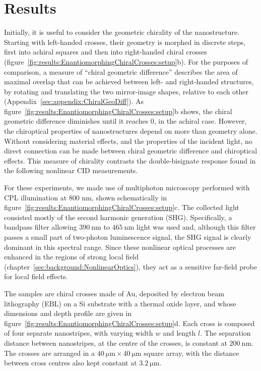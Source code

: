\section{Results}\label{sec:results:EnantiomorphingChiralCrosses:results}

Initially, it is useful to consider the geometric chirality of the nanostructure. Starting with left-handed crosses, their geometry is morphed in discrete steps, first into achiral squares and then into right-handed chiral crosses (figure~\ref{fig:results:EnantiomorphingChiralCrosses:setup}b). 
For the purposes of comparison, a measure of ``chiral geometric difference'' describes the area of maximal overlap that can be achieved between left- and right-handed structures, by rotating and translating the two mirror-image shapes, relative to each other (Appendix~\ref{sec:appendix:ChiralGeoDiff}). 
As figure~\ref{fig:results:EnantiomorphingChiralCrosses:setup}b shows, the chiral geometric difference diminishes until it reaches 0, in the achiral case. However, the chiroptical properties of nanostructures depend on more than geometry alone. Without considering material effects, and the properties of the incident light, no direct connection can be made between chiral geometric difference and chiroptical effects. This measure of chirality contrasts the double-bisignate response found in the following nonlinear CID measurements.

For these experiments, we made use of multiphoton microscopy performed with CPL illumination at 800 nm, shown schematically in figure~\ref{fig:results:EnantiomorphingChiralCrosses:setup}c. The collected light consisted mostly of the second harmonic generation (SHG). Specifically, a bandpass filter allowing $\SI{390}{\nano\m}$ to $\SI{465}{\nano\m}$ light was used and, although this filter passes a small part of two-photon luminescence signal, the SHG signal is clearly dominant in this spectral range. Since these nonlinear optical processes are enhanced in the regions of strong local field (chapter~\ref{sec:background:NonlinearOptics}), they act as a sensitive far-field probe for local field effects. 

The samples are chiral crosses made of Au, deposited by electron beam lithography (EBL) on a Si substrate with a thermal oxide layer, and whose dimensions and depth profile are given in figure~\ref{fig:results:EnantiomorphingChiralCrosses:setup}d. Each cross is composed of four separate nanostripes, with varying width $w$ and length $l$. The separation distance between nanostripes, at the centre of the crosses, is constant at $\SI{200}{\nano\m}$. The crosses are arranged in a $\SI{40}{\micro\m} \times \SI{40}{\micro\m}$ square array, with the distance between cross centres also kept constant at $\SI{3.2}{\micro\m}$. 


